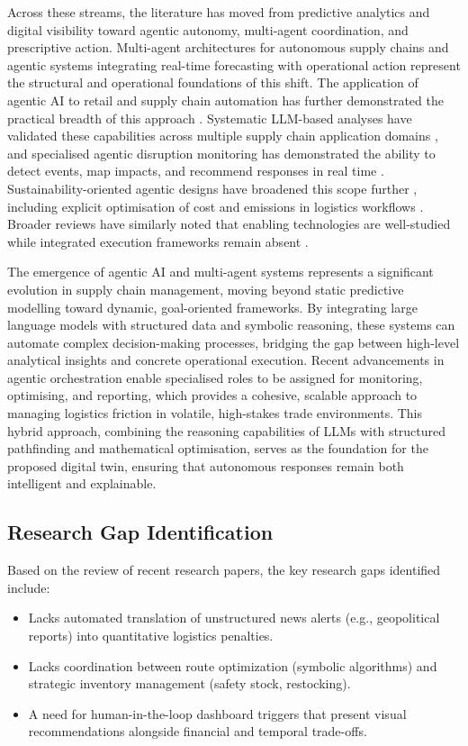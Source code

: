 Across these streams, the literature has moved from predictive analytics and digital visibility toward agentic autonomy, multi-agent coordination, and prescriptive action. Multi-agent architectures for autonomous supply chains \cite{XuEtAl2024} and agentic systems integrating real-time forecasting with operational action \cite{Tiwari2025} represent the structural and operational foundations of this shift. The application of agentic AI to retail and supply chain automation has further demonstrated the practical breadth of this approach \cite{Kalisetty2024}. Systematic LLM-based analyses have validated these capabilities across multiple supply chain application domains \cite{QuHuIvanov2026}, and specialised agentic disruption monitoring has demonstrated the ability to detect events, map impacts, and recommend responses in real time \cite{AlMahriEtAl2026}. Sustainability-oriented agentic designs have broadened this scope further \cite{Tathavadekar2025}, including explicit optimisation of cost and emissions in logistics workflows \cite{Aylak2025}. Broader reviews have similarly noted that enabling technologies are well-studied while integrated execution frameworks remain absent \cite{White2026}.

The emergence of agentic AI and multi-agent systems represents a significant evolution in supply chain management, moving beyond static predictive modelling toward dynamic, goal-oriented frameworks. By integrating large language models with structured data and symbolic reasoning, these systems can automate complex decision-making processes, bridging the gap between high-level analytical insights and concrete operational execution. Recent advancements in agentic orchestration enable specialised roles to be assigned for monitoring, optimising, and reporting, which provides a cohesive, scalable approach to managing logistics friction in volatile, high-stakes trade environments. This hybrid approach, combining the reasoning capabilities of LLMs with structured pathfinding and mathematical optimisation, serves as the foundation for the proposed digital twin, ensuring that autonomous responses remain both intelligent and explainable.
\subsection[Research Gap Identification]{\textbf{Research Gap Identification}}

Based on the review of recent research papers, the key research gaps identified include:
\begin{itemize}
    \item Lacks automated translation of unstructured news alerts (e.g., geopolitical reports) into quantitative logistics penalties.
    \item Lacks coordination between route optimization (symbolic algorithms) and strategic inventory management (safety stock, restocking).
    \item A need for human-in-the-loop dashboard triggers that present visual recommendations alongside financial and temporal trade-offs.
\end{itemize}

